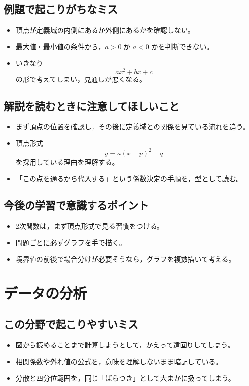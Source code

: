 \subsection*{例題で起こりがちなミス}
\begin{itemize}
  \item 頂点が定義域の内側にあるか外側にあるかを確認しない。
  \item 最大値・最小値の条件から，$a>0$ か $a<0$ かを判断できない。
  \item いきなり
  \[
  ax^2+bx+c
  \]
  の形で考えてしまい，見通しが悪くなる。
\end{itemize}

\subsection*{解説を読むときに注意してほしいこと}
\begin{itemize}
  \item まず頂点の位置を確認し，その後に定義域との関係を見ている流れを追う。
  \item 頂点形式
  \[
  y=a(x-p)^2+q
  \]
  を採用している理由を理解する。
  \item 「この点を通るから代入する」という係数決定の手順を，型として読む。
\end{itemize}

\subsection*{今後の学習で意識するポイント}
\begin{itemize}
  \item 2次関数は，まず頂点形式で見る習慣をつける。
  \item 問題ごとに必ずグラフを手で描く。
  \item 境界値の前後で場合分けが必要そうなら，グラフを複数描いて考える。
\end{itemize}

\bigskip

\section*{データの分析}

\subsection*{この分野で起こりやすいミス}
\begin{itemize}
  \item 図から読めることまで計算しようとして，かえって遠回りしてしまう。
  \item 相関係数や外れ値の公式を，意味を理解しないまま暗記している。
  \item 分散と四分位範囲を，同じ「ばらつき」として大まかに扱ってしまう。
\end{itemize}


